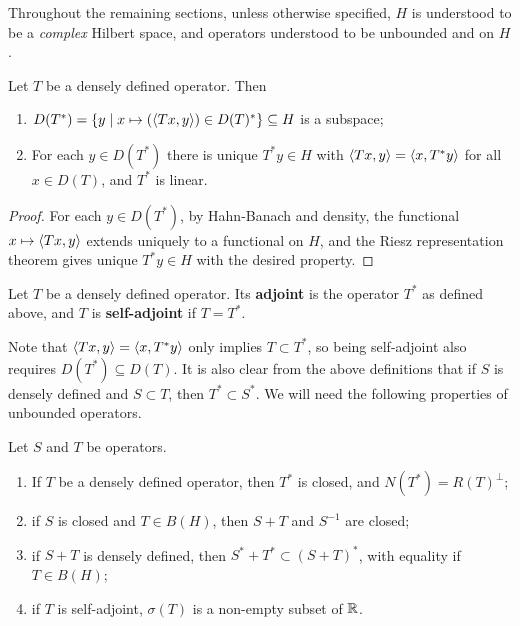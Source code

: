 \documentclass[10pt]{amsart}
\begin{document}
Throughout the remaining sections, unless otherwise specified, $H$ is understood to be a \emph{complex} Hilbert space, and operators understood to be unbounded and on $H$. %
\begin{lemma}
    Let $T$ be a densely defined operator. Then
    \begin{enumerate}
        \item $D(T^*) = \left\{  y \mid x \mapsto (\left\langle Tx, y \right\rangle) \in D(T)^*  \right\} \subseteq H$ is a subspace;
        \item For each $y \in D(T^*)$ there is unique $T^*y \in H$ with $\left\langle Tx, y \right\rangle = \left\langle x, T^*y \right\rangle$ for all $x \in D(T)$, and $T^*$ is linear.
    \end{enumerate}
\end{lemma}
\begin{proof}
    For each $y \in D(T^*)$, by Hahn-Banach and density, the functional $x \mapsto \left\langle Tx, y \right\rangle$ extends uniquely to a functional on $H$, and the Riesz representation theorem gives unique $T^*y \in H$ with the desired property.
\end{proof}
\begin{definition}
    Let $T$ be a densely defined operator. Its \textbf{adjoint} is the operator $T^*$ as defined above, and $T$ is \textbf{self-adjoint} if $T = T^*$.
\end{definition}
Note that $\left\langle Tx, y \right\rangle = \left\langle x, T^*y \right\rangle$ only implies $T \subset T^*$, so being self-adjoint also requires $D(T^*) \subseteq D(T)$.
It is also clear from the above definitions that if $S$ is densely defined and $S \subset T$, then $T^* \subset S^*$. We will need the following properties of unbounded operators.
\begin{proposition}\label{adjclosed}
    Let $S$ and $T$ be operators. 
    \begin{enumerate}
        \item If $T$ be a densely defined operator, then $T^*$ is closed, and $N(T^*) = R(T)^\perp$;
        \item if $S$ is closed and $T \in B(H)$, then $S + T$ and $S^{-1}$ are closed;
        \item if $S + T$ is densely defined, then $S^* + T^* \subset (S + T)^*$, with equality if $T \in B(H)$;
        \item if $T$ is self-adjoint, $\sigma(T)$ is a non-empty subset of $\mathbb{R}$.
    \end{enumerate}
\end{proposition}
\end{document}
